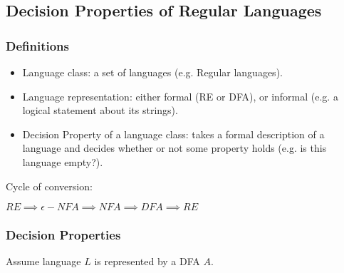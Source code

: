 \subsection{\color{ForestGreen} Decision Properties of Regular Languages}
\subsubsection{Definitions}
\begin{itemize}
    \item Language class: a set of languages (e.g. Regular languages).
    \item Language representation: either formal (RE or DFA), or informal (e.g. a logical statement about its strings).
    \item Decision Property of a language class: takes a formal description of a language and decides whether or not some property holds (e.g. is this language empty?).
\end{itemize}
Cycle of conversion: 

$RE \implies \epsilon-NFA \implies NFA \implies DFA \implies RE$

\subsubsection{Decision Properties}
Assume language $L$ is represented by a DFA $A$.

